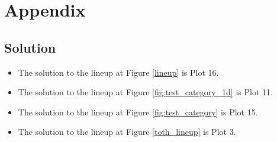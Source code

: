 %


\section{Appendix}

\subsection{Solution}
\begin{itemize}
\item The solution to the lineup at Figure \ref{lineup} is Plot 16. 
\item The solution to the lineup at Figure \ref{fig:test_category_1d} is Plot 11.
\item The solution to the lineup at Figure \ref{fig:test_category} is Plot 15.
\item The solution to the lineup at Figure \ref{toth_lineup} is Plot 3.


\end{itemize}

